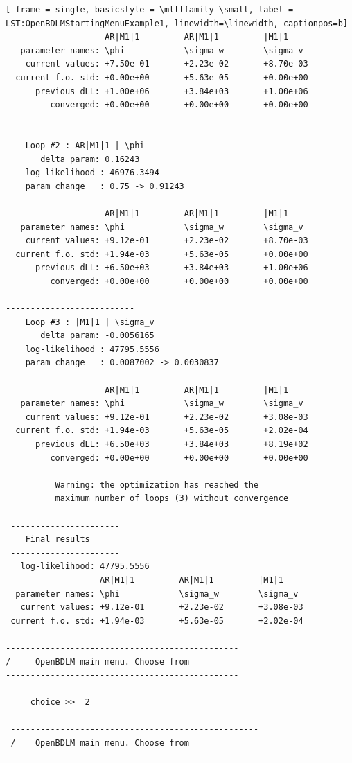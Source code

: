 \documentclass[11pt,twoside]{article}
\begin{document}
\begin{lstlisting}[ frame = single, basicstyle = \mlttfamily \small, label = LST:OpenBDLMStartingMenuExample1, linewidth=\linewidth, captionpos=b]
                    AR|M1|1         AR|M1|1         |M1|1           
   parameter names: \phi            \sigma_w        \sigma_v        
    current values: +7.50e-01       +2.23e-02       +8.70e-03      
  current f.o. std: +0.00e+00       +5.63e-05       +0.00e+00      
      previous dLL: +1.00e+06       +3.84e+03       +1.00e+06      
         converged: +0.00e+00       +0.00e+00       +0.00e+00      

--------------------------
    Loop #2 : AR|M1|1 | \phi 
       delta_param: 0.16243 
    log-likelihood : 46976.3494
    param change   : 0.75 -> 0.91243

                    AR|M1|1         AR|M1|1         |M1|1           
   parameter names: \phi            \sigma_w        \sigma_v        
    current values: +9.12e-01       +2.23e-02       +8.70e-03      
  current f.o. std: +1.94e-03       +5.63e-05       +0.00e+00      
      previous dLL: +6.50e+03       +3.84e+03       +1.00e+06      
         converged: +0.00e+00       +0.00e+00       +0.00e+00      

--------------------------
    Loop #3 : |M1|1 | \sigma_v 
       delta_param: -0.0056165 
    log-likelihood : 47795.5556
    param change   : 0.0087002 -> 0.0030837

                    AR|M1|1         AR|M1|1         |M1|1           
   parameter names: \phi            \sigma_w        \sigma_v        
    current values: +9.12e-01       +2.23e-02       +3.08e-03      
  current f.o. std: +1.94e-03       +5.63e-05       +2.02e-04      
      previous dLL: +6.50e+03       +3.84e+03       +8.19e+02      
         converged: +0.00e+00       +0.00e+00       +0.00e+00      

          Warning: the optimization has reached the  
          maximum number of loops (3) without convergence 

 ----------------------
    Final results
 ----------------------
   log-likelihood: 47795.5556
                   AR|M1|1         AR|M1|1         |M1|1           
  parameter names: \phi            \sigma_w        \sigma_v        
   current values: +9.12e-01       +2.23e-02       +3.08e-03      
 current f.o. std: +1.94e-03       +5.63e-05       +2.02e-04      

----------------------------------------------- 
/     OpenBDLM main menu. Choose from 
-----------------------------------------------

     choice >>  2
         
 --------------------------------------------------
 /    OpenBDLM main menu. Choose from 
-------------------------------------------------- 


\end{lstlisting}
\end{document}
